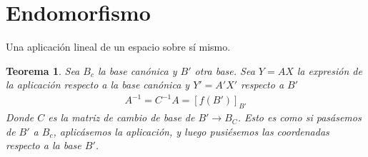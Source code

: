 \documentclass{article}
\newtheorem{teor}{Teorema}
\begin{document}
\section{Endomorfismo}
Una aplicación lineal de un espacio sobre sí mismo.
\begin{teor}
    Sea $B_{c}$ la base canónica y $B'$ otra base. Sea $Y=AX$ la expresión de la aplicación respecto
    a la base canónica y $Y'=A'X'$ respecto a $B'$
    \begin{equation}
        \begin{split}
            A^{-1}=C^{-1}A = [f(B')]_{B'}
        \end{split}
    \end{equation}
    Donde $C$ es la matriz de cambio de base de $B' \to B_{C}$. Esto es como si pasásemos
    de $B'$ a $B_{c}$, aplicásemos la aplicación, y luego pusiésemos las coordenadas respecto
    a la base $B'$.
\end{teor}
\end{document}
